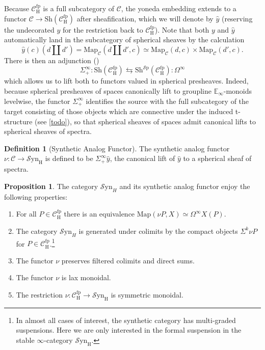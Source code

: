 \documentclass[10pt]{amsart}
\theoremstyle{definition}
\numberwithin{figure}{section}
\numberwithin{equation}{section}
\newtheorem{proposition}[figure]{Proposition}
\newtheorem{definition}[figure]{Definition}
\newcommand{\cC}{\mathcal{C}}
\theoremstyle{cited}
\newcommand{\bE}{\mathbb{E}}
\newcommand{\Sp}{{\mathcal{S}\mathrm{p}}}
\newcommand{\Map}{\mathrm{Map}}
\newcommand{\Sh}{\mathrm{Sh}}
\newcommand{\fp}{\mathrm{fp}}
\newcommand{\Syn}{\mathcal{S}\mathrm{yn}}
\renewcommand{\H}{\mathrm{H}}
\begin{document}
Because $\cC_\H^\fp$ is a full subcategory of $\cC$, the yoneda embedding extends to a functor $\cC\to \Sh(\cC_\H^\fp)$ after sheafification, which we will denote by $\hat y$ (reserving the undecorated $y$ for the restriction back to $\cC^\fp_\H$). Note that both $y$ and $\hat y$ automatically land in the subcategory of spherical sheaves by the calculation
\[
  \hat y(c)(d\amalg d')=\Map_{\cC}(d\amalg d', c)\simeq \Map_{\cC}(d, c)\times \Map_{\cC}(d', c).
\]
There is then an adjunction (\cite{Pst22})
\[
\Sigma^\infty_+:\Sh(\cC_\H^\fp) \leftrightarrows \Sh^\Sp(\cC_\H^\fp):\Omega^\infty
\]
which allows us to lift both to functors valued in spherical presheaves. Indeed, because spherical presheaves of spaces canonically lift to groupline $\bE_\infty$-monoids levelwise, the functor $\Sigma_+^\infty$ identifies the source with the full subcategory of the target consisting of those objects which are connective under the induced t-structure (see \ref{todo}), so that spherical sheaves of spaces admit canonical lifts to spherical sheaves of spectra.

\begin{definition}[Synthetic Analog Functor]\label{def:synanalog}
  The synthetic analog functor $\nu:\cC\to \Syn_\H$ is defined to be $\Sigma_+^\infty \hat y$, the canonical lift of $\hat y$ to a spherical sheaf of spectra.
\end{definition}

\begin{proposition}\label{prop:analogprops}
   The category $\Syn_H$ and its synthetic analog functor enjoy the following properties:
   \begin{enumerate}
    \item For all $P\in \cC_\H^\fp$ there is an equivalence $\Map(\nu P, X)\simeq \Omega^\infty X(P)$.
    \item The category $\Syn_H$ is generated under colimits by the compact objects $\Sigma^{k}\nu P$ for $P\in \cC_\H^\fp$.\footnote{In almost all cases of interest, the synthetic category has multi-graded suspensions. Here we are only interested in the formal suspension in the stable $\infty$-category $\Syn_\H$.}
    \item The functor $\nu$ preserves filtered colimits and direct sums.
    \item The functor $\nu$ is lax monoidal.
    \item The restriction $\nu:\cC_\H^\fp\to \Syn_\H$ is symmetric monoidal.
   \end{enumerate}  
\end{proposition}
\end{document}

